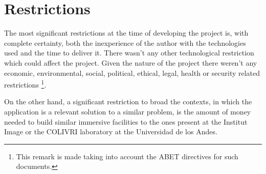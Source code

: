 \section{Restrictions}
The most significant restrictions at the time of developing the project is, with complete certainty, both the inexperience of the author with the technologies used and the time to deliver it. There wasn't any other technological restriction which could affect the project. Given the nature of the project there weren't any economic, environmental, social, political, ethical, legal, health or security related restrictions \footnote{This remark is made taking into account the ABET directives for such documents.}.

On the other hand, a significant restriction to broad the contexts, in which the application is a relevant solution to a similar problem, is the amount of money needed to build similar immersive facilities to the ones present at the Institut Image or the COLIVRI laboratory at the Universidad de los Andes. 